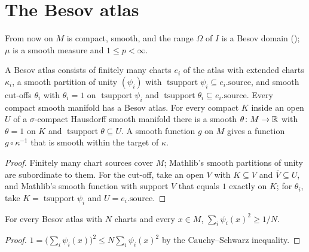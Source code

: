 \section{The Besov atlas}
\label{sec:besov-atlas}

From now on $M$ is compact, smooth, and the range $\Omega$ of $I$ is a Besov domain
(); $\mu$ is a smooth measure and $1 \leq p < \infty$.

\begin{definition}
\label{def:besov-atlas}
\leanok
A Besov atlas consists of finitely many charts $e_i$ of the atlas with extended charts
$\kappa_i$, a smooth partition of unity $(\psi_i)$ with $\operatorname{tsupport} \psi_i \subseteq
e_i.\mathrm{source}$, and smooth cut-offs $\theta_i$ with $\theta_i = 1$ on
$\operatorname{tsupport} \psi_i$ and $\operatorname{tsupport} \theta_i \subseteq
e_i.\mathrm{source}$. Every compact smooth manifold has a Besov atlas. For every compact $K$
inside an open $U$ of a $\sigma$-compact Hausdorff smooth manifold there is a smooth
$\theta \colon M \to \mathbb{R}$ with $\theta = 1$ on $K$ and $\operatorname{tsupport} \theta \subseteq U$.
A smooth function $g$ on $M$ gives a function $g \circ \kappa^{-1}$ that is smooth within the
target of $\kappa$.
\end{definition}

\begin{proof}
\leanok
Finitely many chart sources cover $M$; Mathlib's smooth partitions of unity are subordinate to
them. For the cut-off, take an open $V$ with $K \subseteq V$ and $\overline{V} \subseteq U$, and
Mathlib's smooth function with support $V$ that equals $1$ exactly on $K$; for $\theta_i$, take
$K = \operatorname{tsupport} \psi_i$ and $U = e_i.\mathrm{source}$.
\end{proof}

\begin{lemma}
\label{lem:partition-squares}
\leanok
{}
For every Besov atlas with $N$ charts and every $x \in M$, $\sum_i \psi_i(x)^2 \geq 1/N$.
\end{lemma}

\begin{proof}
\leanok
$1 = \bigl(\sum_i \psi_i(x)\bigr)^2 \leq N \sum_i \psi_i(x)^2$ by the Cauchy--Schwarz inequality.
\end{proof}


